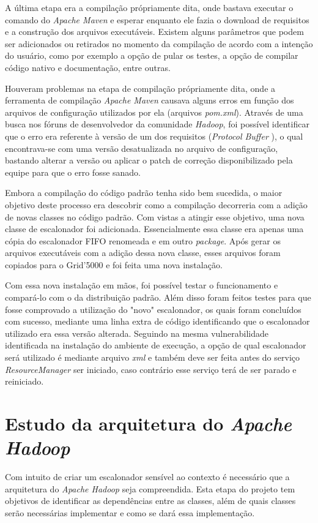 A última etapa era a compilação própriamente dita, onde bastava executar o comando do \emph{Apache Maven} \cite{Maven} e esperar enquanto ele fazia o download de requisitos e a construção dos arquivos executáveis. Existem alguns parâmetros que podem ser adicionados ou retirados no momento da compilação de acordo com a intenção do usuário, como por exemplo a opção de pular os testes, a opção de compilar código nativo e documentação, entre outras.

Houveram problemas na etapa de compilação própriamente dita, onde a ferramenta de compilação \emph{Apache Maven} causava alguns erros em função dos arquivos de configuração utilizados por ela (arquivos \emph{pom.xml}). Através de uma busca nos fóruns de desenvolvedor da comunidade \emph{Hadoop}, foi possível identificar que o erro era referente à versão de um dos requisitos (\emph{Protocol Buffer} \cite{protobuff}), o qual encontrava-se com uma versão desatualizada no arquivo de configuração, bastando alterar a versão ou aplicar o patch de correção disponibilizado pela equipe para que o erro fosse sanado.

Embora a compilação do código padrão tenha sido bem sucedida, o maior objetivo deste processo era descobrir como a compilação decorreria com a adição de novas classes no código padrão. Com vistas a atingir esse objetivo, uma nova classe de escalonador foi adicionada. Essencialmente essa classe era apenas uma cópia do escalonador FIFO renomeada e em outro \emph{package}. Após gerar os arquivos executáveis com a adição dessa nova classe, esses arquivos foram copiados para o Grid'5000 e foi feita uma nova instalação.

Com essa nova instalação em mãos, foi possível testar o funcionamento e compará-lo com o da distribuição padrão. Além disso foram feitos testes para que fosse comprovado a utilização do "novo" escalonador, os quais foram concluídos com sucesso, mediante uma linha extra de código identificando que o escalonador utilizado era essa versão alterada. Seguindo na mesma vulnerabilidade identificada na instalação do ambiente de execução, a opção de qual escalonador será utilizado é mediante arquivo \emph{xml} e também deve ser feita antes do serviço \emph{ResourceManager} ser iniciado, caso contrário esse serviço terá de ser parado e reiniciado.

\section{Estudo da arquitetura do \emph{Apache Hadoop}}
Com intuito de criar um escalonador sensível ao contexto é necessário que a arquitetura do \emph{Apache Hadoop} seja compreendida. Esta etapa do projeto tem objetivos de identificar as dependências entre as classes, além de quais classes serão necessárias implementar e como se dará essa implementação.

